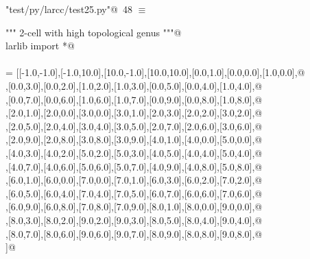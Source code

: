 \documentclass[11pt,oneside]{article}    %
\begin{document}
\begin{flushleft} \small \label{scrap79}
\protect{}\verb@"test/py/larcc/test25.py"@\nobreak\ {\footnotesize 48 }$\equiv$
\vspace{-1ex}
\begin{list}{}{} \item
\mbox{}\verb@""" 2-cell with high topological genus """@\\
\mbox{}\verb@from larlib import *@\\
\mbox{}\verb@@\\
\mbox{}\verb@V = [[-1.0,-1.0],[-1.0,10.0],[10.0,-1.0],[10.0,10.0],[0.0,1.0],[0.0,0.0],[1.0,0.0],@\\
\mbox{}\verb@[1.0,1.0],[0.0,3.0],[0.0,2.0],[1.0,2.0],[1.0,3.0],[0.0,5.0],[0.0,4.0],[1.0,4.0],@\\
\mbox{}\verb@[1.0,5.0],[0.0,7.0],[0.0,6.0],[1.0,6.0],[1.0,7.0],[0.0,9.0],[0.0,8.0],[1.0,8.0],@\\
\mbox{}\verb@[1.0,9.0],[2.0,1.0],[2.0,0.0],[3.0,0.0],[3.0,1.0],[2.0,3.0],[2.0,2.0],[3.0,2.0],@\\
\mbox{}\verb@[3.0,3.0],[2.0,5.0],[2.0,4.0],[3.0,4.0],[3.0,5.0],[2.0,7.0],[2.0,6.0],[3.0,6.0],@\\
\mbox{}\verb@[3.0,7.0],[2.0,9.0],[2.0,8.0],[3.0,8.0],[3.0,9.0],[4.0,1.0],[4.0,0.0],[5.0,0.0],@\\
\mbox{}\verb@[5.0,1.0],[4.0,3.0],[4.0,2.0],[5.0,2.0],[5.0,3.0],[4.0,5.0],[4.0,4.0],[5.0,4.0],@\\
\mbox{}\verb@[5.0,5.0],[4.0,7.0],[4.0,6.0],[5.0,6.0],[5.0,7.0],[4.0,9.0],[4.0,8.0],[5.0,8.0],@\\
\mbox{}\verb@[5.0,9.0],[6.0,1.0],[6.0,0.0],[7.0,0.0],[7.0,1.0],[6.0,3.0],[6.0,2.0],[7.0,2.0],@\\
\mbox{}\verb@[7.0,3.0],[6.0,5.0],[6.0,4.0],[7.0,4.0],[7.0,5.0],[6.0,7.0],[6.0,6.0],[7.0,6.0],@\\
\mbox{}\verb@[7.0,7.0],[6.0,9.0],[6.0,8.0],[7.0,8.0],[7.0,9.0],[8.0,1.0],[8.0,0.0],[9.0,0.0],@\\
\mbox{}\verb@[9.0,1.0],[8.0,3.0],[8.0,2.0],[9.0,2.0],[9.0,3.0],[8.0,5.0],[8.0,4.0],[9.0,4.0],@\\
\mbox{}\verb@[9.0,5.0],[8.0,7.0],[8.0,6.0],[9.0,6.0],[9.0,7.0],[8.0,9.0],[8.0,8.0],[9.0,8.0],@\\
\mbox{}\verb@[9.0,9.0]]@\\
\mbox{}\verb@@\\

\end{list}
\end{flushleft}
\end{document}
